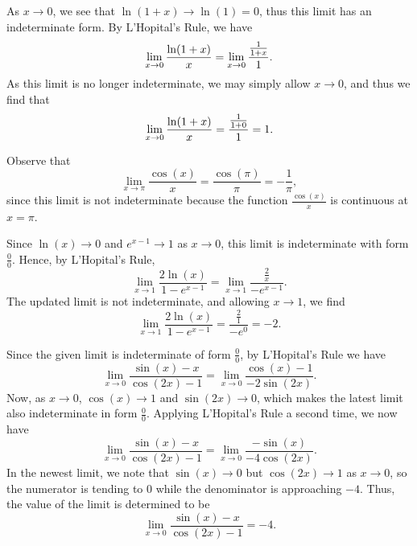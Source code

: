 \begin{activitySolution}
\ba
\item As $x \to 0$, we see that $\ln(1+x) \to \ln(1) = 0$, thus this limit has an indeterminate form.  By L'Hopital's Rule, we have
$$\displaystyle \lim_{x \to 0} \frac{\ln(1 + x)}{x} = \displaystyle \lim_{x \to 0} \frac{\frac{1}{1 + x}}{1}.$$
As this limit is no longer indeterminate, we may simply allow $x \to 0$, and thus we find that
$$\displaystyle \lim_{x \to 0} \frac{\ln(1 + x)}{x} = \frac{\frac{1}{1 + 0}}{1} = 1.$$
\item Observe that
$$\lim_{x \to \pi} \frac{\cos(x)}{x} = \frac{\cos(\pi)}{\pi} = -\frac{1}{\pi},$$
since this limit is not indeterminate because the function $\frac{\cos(x)}{x}$ is continuous at $x = \pi$.
\item Since $\ln(x) \to 0$ and $e^{x-1} \to 1$ as $x \to 0$, this limit is indeterminate with form $\frac{0}{0}$.  Hence, by L'Hopital's Rule, 
$$\lim_{x \to 1} \frac{2 \ln(x)}{1-e^{x-1}} = \lim_{x \to 1} \frac{\frac{2}{x}}{-e^{x-1}}.$$
The updated limit is not indeterminate, and allowing $x \to 1$, we find
$$\lim_{x \to 1} \frac{2 \ln(x)}{1-e^{x-1}} = \frac{\frac{2}{1}}{-e^{0}} = -2.$$ 
\item Since the given limit is indeterminate of form $\frac{0}{0}$, by L'Hopital's Rule we have
$$\lim_{x \to 0} \frac{\sin(x) - x}{\cos(2x)-1} =  \lim_{x \to 0} \frac{\cos(x) - 1}{-2\sin(2x)}.$$
Now, as $x \to 0$, $\cos(x) \to 1$ and $\sin(2x) \to 0$, which makes the latest limit also indeterminate in form $\frac{0}{0}$.  Applying L'Hopital's Rule a second time, we now have
$$\lim_{x \to 0} \frac{\sin(x) - x}{\cos(2x)-1} =  \lim_{x \to 0} \frac{-\sin(x)}{-4\cos(2x)}.$$
In the newest limit, we note that $\sin(x) \to 0$ but $\cos(2x) \to 1$ as $x \to 0$, so the numerator is tending to 0 while the denominator is approaching $-4$.  Thus, the value of the limit is determined to be
$$\lim_{x \to 0} \frac{\sin(x) - x}{\cos(2x)-1} =  -4.$$
\ea
\end{activitySolution}
\aftera